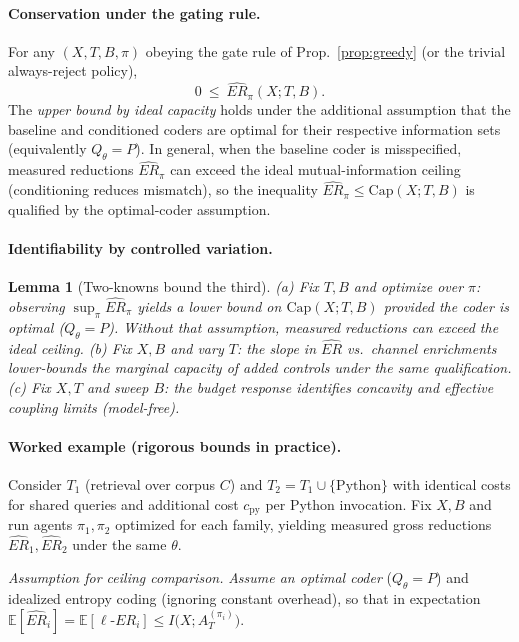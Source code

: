 \documentclass[12pt,a4paper]{article}
\newtheorem{lemma}{Lemma}
\newcommand{\ERideal}{\ell\text{-}ER}
\begin{document}
\paragraph{Conservation under the gating rule.}
For any $(X,T,B,\pi)$ obeying the gate rule of Prop.~\ref{prop:greedy} (or the trivial always-reject policy),
\begin{equation}
0\ \le\ \widehat{ER}_\pi(X;T,B).
\end{equation}
The \emph{upper bound by ideal capacity} holds under the additional assumption that the baseline and conditioned coders are optimal for their respective information sets (equivalently $Q_\theta=P$). In general, when the baseline coder is misspecified, measured reductions $\widehat{ER}_\pi$ can exceed the ideal mutual-information ceiling (conditioning reduces mismatch), so the inequality $\widehat{ER}_\pi\le\mathrm{Cap}(X;T,B)$ is qualified by the optimal-coder assumption.

\paragraph{Identifiability by controlled variation.}
\begin{lemma}[Two-knowns bound the third]
\label{lem:two-knowns}
(a) Fix $T,B$ and optimize over $\pi$: observing $\sup_\pi \widehat{ER}_\pi$ yields a \emph{lower bound} on $\mathrm{Cap}(X;T,B)$ \emph{provided the coder is optimal} ($Q_\theta=P$). Without that assumption, measured reductions can exceed the ideal ceiling. 
(b) Fix $X,B$ and vary $T$: the slope in $\widehat{ER}$ vs.\ channel enrichments lower-bounds the marginal capacity of added controls under the same qualification. 
(c) Fix $X,T$ and sweep $B$: the budget response identifies concavity and effective coupling limits (model-free).
\end{lemma}

\paragraph{Worked example (rigorous bounds in practice).}
Consider $T_1$ (retrieval over corpus $C$) and $T_2=T_1\cup\{\text{Python}\}$ with identical costs for shared queries and additional cost $c_{\text{py}}$ per Python invocation. Fix $X,B$ and run agents $\pi_1,\pi_2$ optimized for each family, yielding measured gross reductions $\widehat{ER}_1,\widehat{ER}_2$ under the same $\theta$.

\textit{Assumption for ceiling comparison.} \emph{Assume an optimal coder} ($Q_\theta=P$) and idealized entropy coding (ignoring constant overhead), so that in expectation $\mathbb{E}[\widehat{ER}_i]=\mathbb{E}[\ERideal_i]\le I\big(X;A_T^{(\pi_i)}\big)$.
\end{document}
